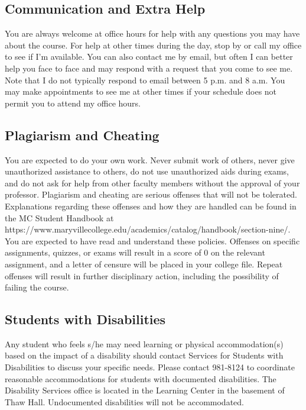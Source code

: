 \documentclass[11pt]{article}
\begin{document}
\subsection*{Communication and Extra Help}
You are always welcome at office hours for help with any
questions you may have about the course. For help at other times during the day, stop by or call my office to see if I'm available. You can also contact me by email, but often I can better help you face to face and may respond with a request that
you come to see me. Note that I do not typically respond to email between 5 p.m. and 8 a.m. You may make appointments to see me at other times if your schedule does not permit you to attend my office hours.


\subsection*{Plagiarism and Cheating}
You are expected to do your own work. Never submit work of others,
never give unauthorized assistance to others, do not use unauthorized
aids during exams, and do not ask for help from other
faculty members without the approval of your professor. Plagiarism and cheating are serious offenses that will not be
tolerated. Explanations regarding these offenses and how they are handled can be found in the MC Student Handbook at\newline
https://www.maryvillecollege.edu/academics/catalog/handbook/section-nine/.\newline
You are expected to have read and understand these policies. Offenses on specific assignments, quizzes, or exams will result
in a score of 0 on the relevant assignment, and a letter of censure will be placed in your college file. Repeat offenses will
result in further disciplinary action, including the possibility of failing the course.

\subsection*{Students with Disabilities}
Any student who feels s/he may need learning or physical
accommodation(s) based on the impact of a disability should contact Services for Students with Disabilities to discuss your
specific needs. Please contact 981-8124 to coordinate reasonable accommodations for students with documented
disabilities. The Disability Services office is located in the Learning Center in the basement of Thaw Hall. Undocumented
disabilities will not be accommodated.
\end{document}
